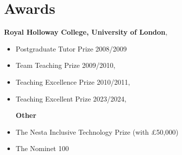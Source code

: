 \section{Awards}
{\textbf{Royal Holloway College, University of London}},
\begin{itemize}
\item {Postgraduate Tutor Prize 2008/2009}  
\item {Team Teaching Prize 2009/2010}, 
\item {Teaching Excellence Prize 2010/2011}, 
\item {Teaching Excellent Prize 2023/2024},

{\textbf{Other}}

\item {The Nesta Inclusive Technology Prize (with £50,000)}
\item {The Nominet 100} 
\end{itemize}


